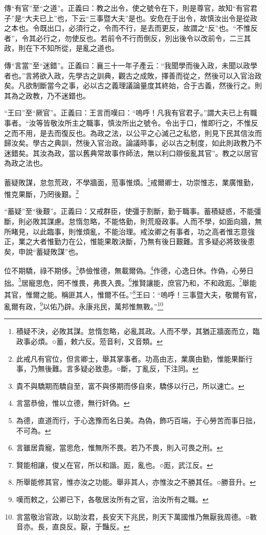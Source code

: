 {\noindent\zhuan{}\fzbyks 傳“有官”至“之道”。正義曰：教之出令，使之號令在下，則是尊官，故知“有官君子”是“大夫已上”也，下云“三事暨大夫”是也。安危在于出令，故慎汝出令是從政之本也。令既出口，必須行之，令而不行，是去而更反，故謂之“反”也。“不惟反者”，令其必行之，勿使反也。若前令不行而倒反，別出後令以改前令，二三其政，則在下不知所從，是亂之道也。 \par}

{\noindent\zhuan{}\fzbyks 傳“言當”至“迷錯”。正義曰：襄三十一年子產云：“我聞學而後入政，未聞以政學者也。”言將欲入政，先學古之訓典，觀古之成敗，擇善而從之，然後可以入官治政矣。凡欲制斷當今之事，必以古之義理議論量度其終始，合于古義，然後行之。則其為之政教，乃不迷錯也。 \par}

{\noindent\shu{}\fzkt “王曰”至“厥官”。正義曰：王言而嘆曰：“嗚呼！凡我有官君子。”謂大夫已上有職事者。“汝等皆敬汝所主之職事，慎汝所出之號令。令出于口，惟即行之，不惟反之而不用，是去而復反也。為政之法，以公平之心滅己之私慾，則見下民其信汝而歸汝矣。學古之典訓，然後入官治政。論議時事，必以古之制度，如此則政教乃不迷錯矣。其汝為政，當以舊典常故事作師法，無以利口辯佞亂其官”。教之以居官為政之法也。 \par}

蓄疑敗謀，怠忽荒政，不學牆面，蒞事惟煩。\footnote{積疑不決，必敗其謀。怠惰忽略，必亂其政。人而不學，其猶正牆面而立，臨政事必煩。○蓄，敕六反。蒞音利，又音類。}戒爾卿士，功崇惟志，業廣惟勤，惟克果斷，乃罔後艱。\footnote{此戒凡有官位，但言卿士，舉其掌事者。功高由志，業廣由勤，惟能果斷行事，乃無後難。言多疑必致患。○斷，丁亂反，下注同。}

{\noindent\shu{}\fzkt “蓄疑”至“後艱”。正義曰：又戒群臣，使彊于割斷，勤于職事。蓄積疑惑，不能彊斷，則必敗其謀慮。怠惰忽略，不能恪勤，則荒廢政事。人而不學，如面向牆，無所睹見，以此臨事，則惟煩亂，不能治理。戒汝卿之有事者，功之高者惟志意強正，業之大者惟勤力在公，惟能果敢決斷，乃無有後日艱難。言多疑必將致後患矣，申說“蓄疑敗謀”也。 \par}

位不期驕，祿不期侈。\footnote{貴不與驕期而驕自至，富不與侈期而侈自來，驕侈以行己，所以速亡。}恭儉惟德，無載爾偽。\footnote{言當恭儉，惟以立德，無行奸偽。}作德，心逸日休。作偽，心勞日拙。\footnote{為德，直道而行，于心逸豫而名日美。為偽，飾巧百端，于心勞苦而事日拙，不可為。}居寵思危，罔不惟畏，弗畏入畏。\footnote{言雖居貴寵，當思危，惟無所不畏。若乃不畏，則入可畏之刑。}推賢讓能，庶官乃和，不和政厖。\footnote{賢能相讓，俊乂在官，所以和諧。厖，亂也。○厖，武江反。}舉能其官，惟爾之能。稱匪其人，惟爾不任。”\footnote{所舉能修其官，惟亦汝之功能。舉非其人，亦惟汝之不勝其任。○勝音升。}王曰：“嗚呼！三事暨大夫，敬爾有官，亂爾有政，\footnote{嘆而敕之，公卿已下，各敬居汝所有之官，治汝所有之職。}以佑乃辟。永康兆民，萬邦惟無斁。”\footnote{言當敬治官政，以助汝君，長安天下兆民，則天下萬國惟乃無厭我周德。○斁音亦。長，直良反。厭，于豔反。}

